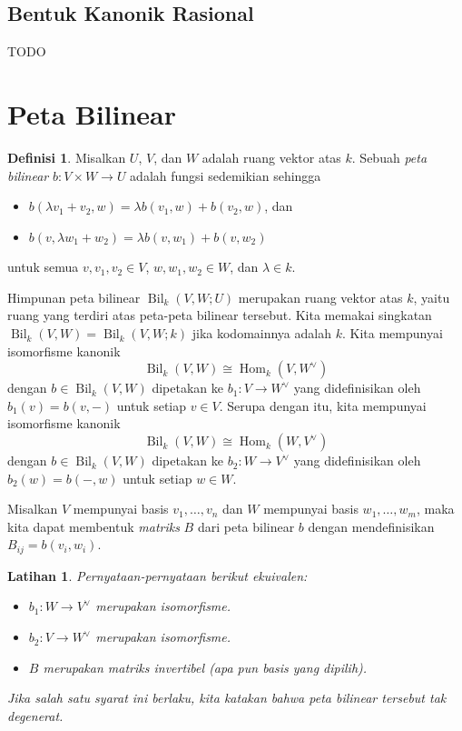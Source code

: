 \documentclass[12pt]{article}
\theoremstyle{plain}
\newtheorem{exercise}[theorem]{Latihan}
\theoremstyle{definition}
\newtheorem{definition}[theorem]{Definisi}
\theoremstyle{remark}
\numberwithin{equation}{section}
\begin{document}
\subsection{Bentuk Kanonik Rasional}

TODO

\section{Peta Bilinear}

\begin{definition}
Misalkan $U$, $V$, dan $W$ adalah ruang vektor atas $k$.
Sebuah \emph{peta bilinear} $b: V \times W \to U$
adalah fungsi sedemikian sehingga
\begin{itemize}
\item $b(\lambda v_1+v_2,w) = \lambda b(v_1,w) + b(v_2,w)$, dan
\item $b(v,\lambda w_1+w_2) = \lambda b(v,w_1) + b(v,w_2)$
\end{itemize}
untuk semua $v,v_1,v_2 \in V$, $w,w_1,w_2 \in W$, dan $\lambda \in k$.
\end{definition}

Himpunan peta bilinear $\operatorname{Bil}_k(V,W;U)$ merupakan ruang vektor atas $k$,
yaitu ruang yang terdiri atas peta-peta bilinear tersebut.
Kita memakai singkatan $\operatorname{Bil}_k(V,W)=\operatorname{Bil}_k(V,W;k)$
jika kodomainnya adalah $k$.
Kita mempunyai isomorfisme kanonik
\[
\operatorname{Bil}_k(V,W) \cong
\operatorname{Hom}_k(V,W^\vee)
\]
dengan $b \in \operatorname{Bil}_k(V,W)$ dipetakan ke $b_1 : V \to W^\vee$
yang didefinisikan oleh $b_1(v) = b(v,-)$ untuk setiap $v \in V$.
Serupa dengan itu, kita mempunyai isomorfisme kanonik
\[
\operatorname{Bil}_k(V,W) \cong
\operatorname{Hom}_k(W,V^\vee)
\]
dengan $b \in \operatorname{Bil}_k(V,W)$ dipetakan ke $b_2 : W \to V^\vee$
yang didefinisikan oleh $b_2(w) = b(-,w)$ untuk setiap $w \in W$.

Misalkan $V$ mempunyai basis $v_1,\ldots,v_n$ dan $W$ mempunyai basis $w_1,\ldots, w_m$,
maka kita dapat membentuk \emph{matriks} $B$ dari peta bilinear $b$ dengan mendefinisikan
$B_{ij} = b(v_i,w_i)$.

\begin{exercise}
Pernyataan-pernyataan berikut ekuivalen:
\begin{itemize}
\item $b_1 : W \to V^\vee$ merupakan isomorfisme.
\item $b_2 : V \to W^\vee$ merupakan isomorfisme.
\item $B$ merupakan matriks invertibel (apa pun basis yang dipilih).
\end{itemize}
Jika salah satu syarat ini berlaku, kita katakan bahwa peta bilinear tersebut
\emph{tak degenerat}.
\end{exercise}
\end{document}
